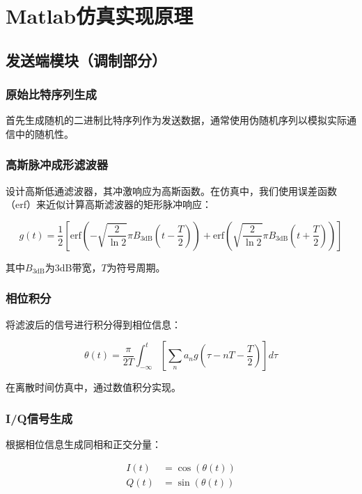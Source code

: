 \documentclass[12pt,a4paper,twoside]{article}
\numberwithin{equation}{section}
\begin{document}
\section{Matlab仿真实现原理}
\subsection{发送端模块（调制部分）}
\subsubsection{原始比特序列生成}

首先生成随机的二进制比特序列作为发送数据，通常使用伪随机序列以模拟实际通信中的随机性。

\subsubsection{高斯脉冲成形滤波器}

设计高斯低通滤波器，其冲激响应为高斯函数。在仿真中，我们使用误差函数（erf）来近似计算高斯滤波器的矩形脉冲响应：

\begin{equation}
    g(t) = \frac{1}{2} \left[ \text{erf}\left( -\sqrt{\frac{2}{\ln 2}} \pi B_{\text{3dB}} \left(t - \frac{T}{2}\right) \right) + \text{erf}\left( \sqrt{\frac{2}{\ln 2}} \pi B_{\text{3dB}} \left(t + \frac{T}{2}\right) \right) \right]
\end{equation}

其中$B_{\text{3dB}}$为3dB带宽，$T$为符号周期。

\subsubsection{相位积分}

将滤波后的信号进行积分得到相位信息：

\begin{equation}
    \theta(t) = \frac{\pi}{2T} \int_{-\infty}^{t} \left[ \sum_n a_n g\left(\tau - nT - \frac{T}{2}\right) \right] d\tau
\end{equation}

在离散时间仿真中，通过数值积分实现。

\subsubsection{I/Q信号生成}

根据相位信息生成同相和正交分量：

\begin{align}
    I(t) &= \cos(\theta(t)) \\
    Q(t) &= \sin(\theta(t))
\end{align}
\end{document}

